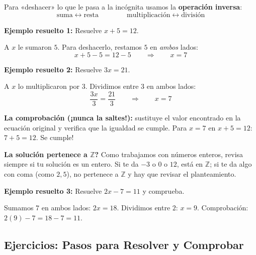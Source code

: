 \documentclass[12pt, letterpaper]{article}
\newcommand{\Z}{\mathbb{Z}}
\begin{document}
\noindent Para «deshacer» lo que le pasa a la incógnita usamos la \textbf{operación inversa}:
\[
  \text{suma} \leftrightarrow \text{resta} \qquad\qquad \text{multiplicación} \leftrightarrow \text{división}
\]

\noindent\textbf{Ejemplo resuelto 1:} Resuelve $x + 5 = 12$.

A $x$ le sumaron $5$. Para deshacerlo, restamos $5$ en \emph{ambos} lados:
\[
  x + 5 - 5 = 12 - 5 \qquad \Rightarrow \qquad x = 7
\]

\noindent\textbf{Ejemplo resuelto 2:} Resuelve $3x = 21$.

A $x$ lo multiplicaron por $3$. Dividimos entre $3$ en ambos lados:
\[
  \frac{3x}{3} = \frac{21}{3} \qquad \Rightarrow \qquad x = 7
\]

\begin{cuadrosolucion}
  \textbf{La comprobación (¡nunca la saltes!):} sustituye el valor encontrado en la ecuación original y verifica que la igualdad se cumple.
  Para $x = 7$ en $x + 5 = 12$: $7 + 5 = 12$. \textquestiondown Se cumple! \checkmark
\end{cuadrosolucion}

\begin{cuadroadvertencia}
  \textbf{\textquestiondown La solución pertenece a $\Z$?} Como trabajamos con números enteros, revisa siempre si tu solución es un entero. Si te da $-3$ o $0$ o $12$, está en $\Z$; si te da algo con coma (como $2{,}5$), no pertenece a $\Z$ y hay que revisar el planteamiento.
\end{cuadroadvertencia}

\noindent\textbf{Ejemplo resuelto 3:} Resuelve $2x - 7 = 11$ y comprueba.

Sumamos $7$ en ambos lados: $2x = 18$. Dividimos entre $2$: $x = 9$. Comprobación: $2(9) - 7 = 18 - 7 = 11$. \checkmark

\subsection{Ejercicios: Pasos para Resolver y Comprobar}
\end{document}
